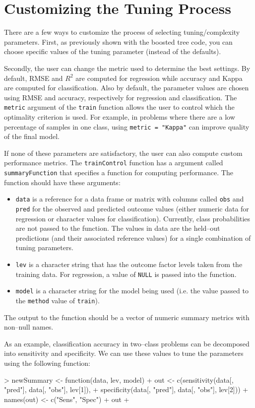 \documentclass[12pt]{article}
\begin{document}
\clearpage

\section{Customizing the Tuning Process}

There are a few ways to customize the process of selecting tuning/complexity parameters. First, as previously shown with the boosted tree code, you can choose specific values of the tuning parameter (instead of the defaults).

Secondly, the user can change the metric used to determine the best settings. By default, RMSE and $R^2$ are computed for regression while accuracy and Kappa are computed for classification. Also by default, the parameter values are chosen using RMSE and accuracy, respectively  for regression and classification. The \texttt{metric} argument of the \texttt{train} function allows the user to control which the optimality criterion is used. For example, in problems where there are a low percentage of samples in one class, using \texttt{metric = "Kappa"} can improve quality of the final model.

If none of these parameters are satisfactory, the user can also compute custom performance metrics. The \texttt{trainControl} function has a argument called \texttt{summaryFunction} that specifies a function for computing performance. The function should have these arguments:
\begin{itemize}
\item \texttt{data} is a reference for a data frame or matrix with columns called \texttt{obs} and \texttt{pred} for the observed and predicted outcome values (either numeric data for regression or character values for classification). Currently, class probabilities are not passed to the function. The values in data are the held--out predictions (and their associated reference values) for a single combination of tuning parameters.
\item \texttt{lev} is a character string that has the outcome factor levels taken from the training data. For regression, a value of \texttt{NULL} is passed into the function.
\item \texttt{model} is a character string for the model being used (i.e. the value passed to the \texttt{method} value of \texttt{train}).
\end{itemize}
The output to the function should be a vector of numeric summary metrics with non--null names. 

As an example, classification accuracy in two--class problems can be decomposed into sensitivity and specificity. We can use these values to tune the parameters using the following function:
\begin{Schunk}
\begin{Sinput}
> newSummary <- function(data, lev, model) {
+     out <- c(sensitivity(data[, "pred"], data[, "obs"], lev[1]), 
+         specificity(data[, "pred"], data[, "obs"], lev[2]))
+     names(out) <- c("Sens", "Spec")
+     out
+ }
\end{Sinput}
\end{Schunk}
\end{document}
